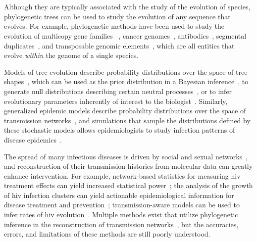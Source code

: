 \chapter*{\introtitle}
\newpage

Although they are typically associated with the study of the evolution of species, phylogenetic trees can be used to study the evolution of any sequence that evolves. For example, phylogenetic methods have been used to study the evolution of multicopy gene families~ \cite{Page1997}, cancer genomes~\cite{El-Kebir2016,Nowell1976}, antibodies~\cite{Litman1993,Robinson2015,Safonova2015}, segmental duplicates~\cite{Bailey2006,Jiang2007}, and transposable genomic elements~\cite{Dewannieux2003,Moshiri2017}, which are all entities that evolve \textit{within} the genome of a single species.

Models of tree evolution describe probability distributions over the space of tree shapes~\cite{Yule1925,Aldous2001}, which can be used as the prior distribution in a Bayesian inference~\cite{Drummond2007,Mooers2012,Sayyari2016}, to generate null distributions describing certain neutral processes~\cite{Guyer1991,Kirkpatrick1993,Agapow2002}, or to infer evolutionary parameters inherently of interest to the biologist~\cite{Morlon2014}. Similarly, generalized epidemic models describe probability distributions over the space of transmission networks~\cite{Sahneh2013}, and simulations that sample the distributions defined by these stochastic models allows epidemiologists to study infection patterns of disease epidemics~\cite{Sahneh2017}.

The spread of many infectious diseases is driven by social and sexual networks~\cite{Rivas2012}, and reconstruction of their transmission histories from molecular data can greatly enhance intervention. For example, network-based statistics for measuring \gls{hiv} treatment effects can yield increased statistical power~\cite{Wertheim2011}; the analysis of the growth of \gls{hiv} infection clusters can yield actionable epidemiological information for disease treatment and prevention~\cite{Aldous2012,Brenner2013}; transmission-aware models can be used to infer rates of \gls{hiv} evolution~\cite{Vrancken2014}. Multiple methods exist that utilize phylogenetic inference in the reconstruction of transmission networks~\cite{Prosperi2011,Ragonnet-Cronin2013,Moshiri2018b,Balaban2019}, but the accuracies, errors, and limitations of these methods are still poorly understood.

